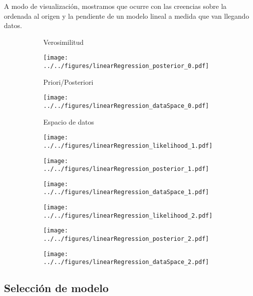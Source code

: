 \documentclass[a4paper,10pt]{article}
\begin{document}
A modo de visualizaci\'on, mostramos que ocurre con las creencias sobre la ordenada al origen y la pendiente de un modelo lineal a medida que van llegando datos.

 \begin{figure}[H]
\begin{subfigure}[t]{0.32\textwidth} 
\caption*{Verosimilitud} 
\end{subfigure}
\begin{subfigure}[t]{0.32\textwidth}
\caption*{Priori/Posteriori} 
\texttt{[image: ../../figures/linearRegression\_posterior\_0.pdf]} 
\end{subfigure}
\begin{subfigure}[t]{0.32\textwidth}
\caption*{Espacio de datos} 
\texttt{[image: ../../figures/linearRegression\_dataSpace\_0.pdf]} 
\end{subfigure}

\begin{subfigure}[c]{0.32\textwidth}
\texttt{[image: ../../figures/linearRegression\_likelihood\_1.pdf]} 
\end{subfigure}
\begin{subfigure}[c]{0.32\textwidth}
\texttt{[image: ../../figures/linearRegression\_posterior\_1.pdf]} 
\end{subfigure}
\begin{subfigure}[c]{0.32\textwidth}
\texttt{[image: ../../figures/linearRegression\_dataSpace\_1.pdf]} 
\end{subfigure}

\begin{subfigure}[c]{0.32\textwidth}
\texttt{[image: ../../figures/linearRegression\_likelihood\_2.pdf]} 
\end{subfigure}
\begin{subfigure}[c]{0.32\textwidth}
\texttt{[image: ../../figures/linearRegression\_posterior\_2.pdf]} 
\end{subfigure}
\begin{subfigure}[c]{0.32\textwidth}
\texttt{[image: ../../figures/linearRegression\_dataSpace\_2.pdf]} 
\end{subfigure}
\end{figure}

\subsection{Selecci\'on de modelo}\label{ssec:seleccion}
\end{document}
